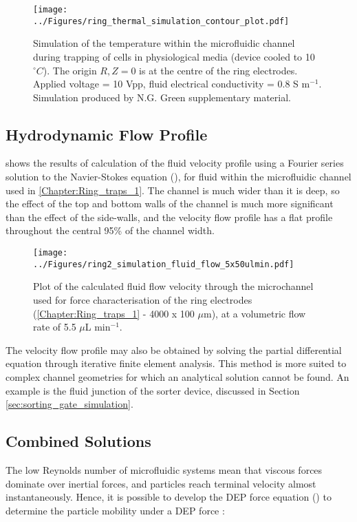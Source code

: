 \begin{figure}[p]
	\centering
		\texttt{[image: ../Figures/ring\_thermal\_simulation\_contour\_plot.pdf]}
	\caption[Ring trap electrothermal simulation.]{Simulation of the temperature within the microfluidic channel during trapping of cells in physiological media (device cooled to 10$^{\circ}C$). The origin $ R,Z = 0 $ is at the centre of the ring electrodes. Applied voltage = 10 Vpp, fluid electrical conductivity = 0.8 S m$^{-1}$. Simulation produced by N.G. Green \citep{Thomas:2009} supplementary material.}
	\label{fig:ring_thermal_simulation_contour_plot}
\end{figure}


\subsection{Hydrodynamic Flow Profile}

 shows the results of calculation of the fluid velocity profile using a Fourier series solution to the Navier-Stokes equation (), for fluid within the microfluidic channel used in \cref{Chapter:Ring_traps_1}. The channel is much wider than it is deep, so the effect of the top and bottom walls of the channel is much more significant than the effect of the side-walls, and the velocity flow profile has a flat profile throughout the central 95\% of the channel width. 

\begin{figure}[p]
	\centering
		\texttt{[image: ../Figures/ring2\_simulation\_fluid\_flow\_5x50ulmin.pdf]}
	\caption[Plot of the fluid flow velocity used for force characterisation of the ring electrodes.]{Plot of the calculated fluid flow velocity through the microchannel used for force characterisation of the ring electrodes (\cref{Chapter:Ring_traps_1} - 4000 x 100 $\mu$m), at a volumetric flow rate of 5.5 $\mu$L min$^{-1}$.}
	\label{fig:ring2_simulation_fluid_flow_5x50ulmin}
\end{figure}

The velocity flow profile may also be obtained by solving the partial differential equation through iterative finite element analysis. This method is more suited to complex channel geometries for which an analytical solution cannot be found. An example is the fluid junction of the sorter device, discussed in Section \ref{sec:sorting_gate_simulation}.


\subsection{Combined Solutions}
The low Reynolds number of microfluidic systems mean that viscous forces dominate over inertial forces, and particles reach terminal velocity almost instantaneously. Hence, it is possible to develop the DEP force equation () to determine the particle mobility under a DEP force \citep{Morgan:2003}: 

